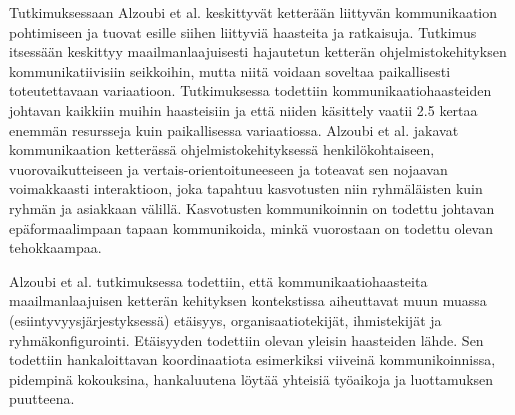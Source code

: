 Tutkimuksessaan Alzoubi et al. \cite{ALZOUBI201622} keskittyvät ketterään liittyvän kommunikaation pohtimiseen ja tuovat esille siihen liittyviä haasteita ja ratkaisuja. Tutkimus itsessään keskittyy maailmanlaajuisesti hajautetun ketterän ohjelmistokehityksen kommunikatiivisiin seikkoihin, mutta niitä voidaan soveltaa paikallisesti toteutettavaan variaatioon. Tutkimuksessa todettiin kommunikaatiohaasteiden johtavan kaikkiin muihin haasteisiin ja että niiden käsittely vaatii 2.5 kertaa enemmän resursseja kuin paikallisessa variaatiossa. Alzoubi et al. jakavat kommunikaation ketterässä ohjelmistokehityksessä henkilökohtaiseen, vuorovaikutteiseen ja vertais-orientoituneeseen ja toteavat sen nojaavan voimakkaasti interaktioon, joka tapahtuu kasvotusten niin ryhmäläisten kuin ryhmän ja asiakkaan välillä. Kasvotusten kommunikoinnin on todettu johtavan epäformaalimpaan tapaan kommunikoida, minkä vuorostaan on todettu olevan tehokkaampaa.

Alzoubi et al. tutkimuksessa \cite{ALZOUBI201622} todettiin, että kommunikaatiohaasteita maailmanlaajuisen ketterän kehityksen kontekstissa aiheuttavat muun muassa (esiintyvyysjärjestyksessä) etäisyys, organisaatiotekijät, ihmistekijät ja ryhmäkonfigurointi. Etäisyyden todettiin olevan yleisin haasteiden lähde. Sen todettiin hankaloittavan koordinaatiota esimerkiksi viiveinä kommunikoinnissa, pidempinä kokouksina, hankaluutena löytää yhteisiä työaikoja ja luottamuksen puutteena. 
